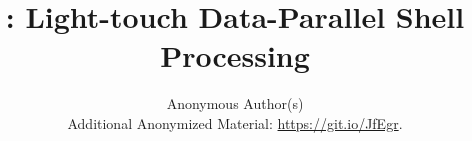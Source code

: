 \documentclass[letterpaper,twocolumn,10pt]{article}
\begin{document}
\title{\sys: Light-touch Data-Parallel Shell Processing}         %



\author{
  Anonymous Author(s)\\
  \normalsize{Additional Anonymized Material: \href{https://git.io/JfEgr}{https://git.io/JfEgr}.}
}

\end{document}

